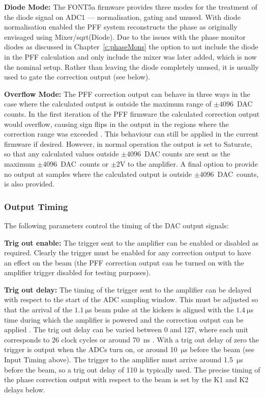 \textbf{Diode Mode:} The FONT5a firmware provides three modes for the treatment of the diode signal on ADC1 --- normalisation, gating and unused. With diode normalisation enabled the PFF system reconstructs the phase as originally envisaged using Mixer/sqrt(Diode). Due to the issues with the phase monitor diodes as discussed in Chapter~\ref{c:phaseMons} the option to not include the diode in the PFF calculation and only include the mixer was later added, which is now the nominal setup. Rather than leaving the diode completely unused, it is usually used to gate the correction output (see below).

\textbf{Overflow Mode:} The PFF correction output can behave in three ways in the case where the calculated output is outside the maximum range of \(\pm4096\)~DAC counts. In the first iteration of the PFF firmware the calculated correction output would overflow, causing sign flips in the output in the regions where the correction range was exceeded \cite{glennPriv}. This behaviour can still be applied in the current firmware if desired. However, in normal operation the output is set to Saturate, so that any calculated values outside \(\pm4096\)~DAC counts are sent as the maximum \(\pm4096\)~DAC~counts or \(\pm2\)V to the amplifier. A final option to provide no output at samples where the calculated output is outside \(\pm4096\)~DAC~counts, is also provided.

\subsubsection{Output Timing}

The following parameters control the timing of the DAC output signals:

\textbf{Trig out enable:} The trigger sent to the amplifier can be enabled or disabled as required. Clearly the trigger must be enabled for any correction output to have an effect on the beam (the PFF correction output can be turned on with the amplifier trigger disabled for testing purposes).

\textbf{Trig out delay:} The timing of the trigger sent to the amplifier can be delayed with respect to the start of the ADC sampling window. This must be adjusted so that the arrival of the \(1.1~\mathrm{\mu}\)s beam pulse at the kickers is aligned with the \(1.4~\mathrm{\mu}\)s time during which the amplifier is powered and the correction output can be applied \cite{colinPriv}. The trig out delay can be varied between 0 and 127, where each unit corresponds to 26 clock cycles or around 70~ns \cite{glennPriv}. With a trig out delay of zero the trigger is output when the ADCs turn on, or around 10~\(\mathrm{\mu}\)s before the beam (see Input Timing above). The trigger to the amplifier must arrive around 1.5~\(\mathrm{\mu}\)s before the beam, so a trig out delay of 110 is typically used. The precise timing of the phase correction output with respect to the beam is set by the K1 and K2 delays below.

